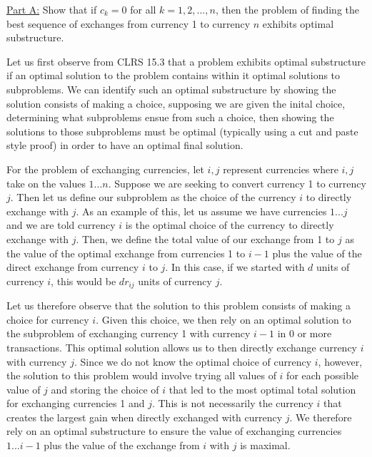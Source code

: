 \documentclass[11pt]{article}
\begin{document}
\underline{Part A:} Show that if $c_k = 0$ for all $k = 1, 2, ..., n$, then the problem of finding the best sequence of exchanges from currency 1 to currency $n$ exhibits optimal substructure.

Let us first observe from CLRS 15.3 that a problem exhibits optimal substructure if an optimal solution to the problem contains within it optimal solutions to subproblems. We can identify such an optimal substructure by showing the solution consists of making a choice, supposing we are given the inital choice, determining what subproblems ensue from such a choice, then showing the solutions to those subproblems must be optimal (typically using a cut and paste style proof) in order to have an optimal final solution.

For the problem of exchanging currencies, let $i,j$ represent currencies where $i,j$ take on the values $1...n$. Suppose we are seeking to convert currency 1 to currency $j$. Then let us define our subproblem as the choice of the currency $i$ to directly exchange with $j$. As an example of this, let us assume we have currencies $1...j$ and we are told currency $i$ is the optimal choice of the currency to directly exchange with $j$. Then, we define the total value of our exchange from 1 to $j$ as the value of the optimal exchange from currencies 1 to $i-1$ plus the value of the direct exchange from currency $i$ to $j$. In this case, if we started with $d$ units of currency $i$, this would be $dr_{ij}$ units of currency $j$.

Let us therefore observe that the solution to this problem consists of making a choice for currency $i$. Given this choice, we then rely on an optimal solution to the subproblem of exchanging currency 1 with currency $i-1$ in 0 or more transactions. This optimal solution allows us to then directly exchange currency $i$ with currency $j$. Since we do not know the optimal choice of currency $i$, however, the solution to this problem would involve trying all values of $i$ for each possible value of $j$ and storing the choice of $i$ that led to the most optimal total solution for exchanging currencies 1 and $j$. This is not necessarily the currency $i$ that creates the largest gain when directly exchanged with currency $j$. We therefore rely on an optimal substructure to ensure the value of exchanging currencies $1...i-1$ plus the value of the exchange from $i$ with $j$ is maximal.
\end{document}
